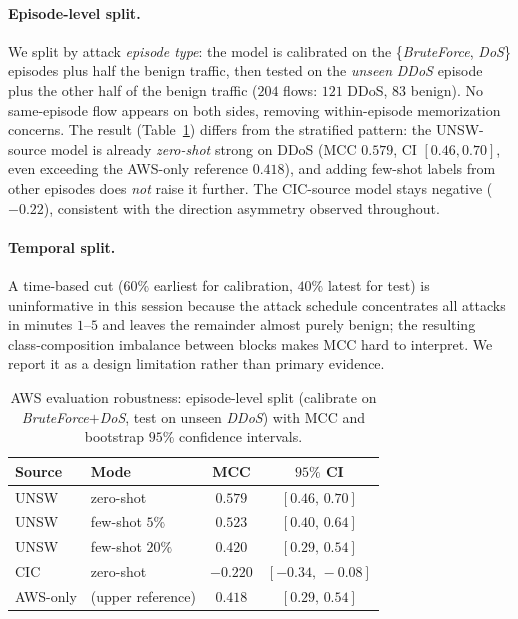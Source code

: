 \documentclass[preprint,12pt,authoryear]{elsarticle}
\begin{document}
\paragraph{Episode-level split.} We split by attack \emph{episode type}: the model
is calibrated on the \{\emph{BruteForce}, \emph{DoS}\} episodes plus half the benign
traffic, then tested on the \emph{unseen} \emph{DDoS} episode plus the other half of
the benign traffic ($204$ flows: $121$ DDoS, $83$ benign). No same-episode flow
appears on both sides, removing within-episode memorization concerns. The result
(Table~\ref{tab:rt-robust}) differs from the stratified pattern: the UNSW-source
model is already \emph{zero-shot} strong on DDoS (MCC $0.579$, CI $[0.46,0.70]$,
even exceeding the AWS-only reference $0.418$), and adding few-shot labels from other
episodes does \emph{not} raise it further. The CIC-source model stays negative
($-0.22$), consistent with the direction asymmetry observed throughout.

\paragraph{Temporal split.} A time-based cut ($60\%$ earliest for calibration,
$40\%$ latest for test) is uninformative in this session because the attack schedule
concentrates all attacks in minutes $1$--$5$ and leaves the remainder almost purely
benign; the resulting class-composition imbalance between blocks makes MCC hard to
interpret. We report it as a design limitation rather than primary evidence.

\begin{table}[htbp]
\centering
\caption{AWS evaluation robustness: episode-level split (calibrate on
\emph{BruteForce}$+$\emph{DoS}, test on unseen \emph{DDoS}) with MCC and bootstrap
$95\%$ confidence intervals.}
\label{tab:rt-robust}
\small
\begin{tabular}{llcc}
\toprule
Source & Mode & MCC & $95\%$ CI \\
\midrule
UNSW & zero-shot        & $0.579$  & $[0.46,\,0.70]$ \\
UNSW & few-shot $5\%$   & $0.523$  & $[0.40,\,0.64]$ \\
UNSW & few-shot $20\%$  & $0.420$  & $[0.29,\,0.54]$ \\
CIC  & zero-shot        & $-0.220$ & $[-0.34,\,-0.08]$ \\
\midrule
AWS-only & (upper reference) & $0.418$ & $[0.29,\,0.54]$ \\
\bottomrule
\end{tabular}
\end{table}
\end{document}
